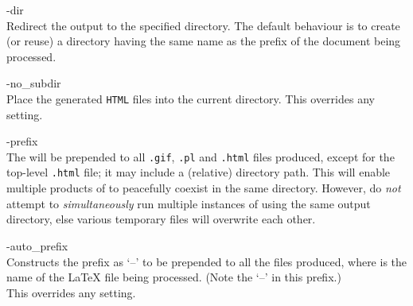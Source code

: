 \begin{htmllist}

\item [ -dir \Meta{output-directory}\label{cs_outputdir}]
\\
Redirect the output to the specified directory.\html{\\}
The default behaviour is to create (or reuse) a directory having the same
name as the prefix of the document being processed.%

%

\item [ -no\_subdir\label{cs_nosubdir}]
\\
Place the generated \texttt{HTML} files into the current directory.
This overrides any  setting.

%
%

\item [ -prefix \Meta{filename-prefix}\label{cs_prefix}]%
\\
The  will be prepended to all 
\texttt{.gif}, \texttt{.pl} and \texttt{.html} files produced, 
except for the top-level \texttt{.html} file;  
it may include a (relative) directory path. 
This will enable multiple products of \latextohtml{} to
peacefully coexist in the same directory.
However, do \emph{not} attempt to \emph{simultaneously} run multiple 
instances of \latextohtml{} using the same output directory, 
else various temporary files will overwrite each other.

%

\item [ -auto\_prefix\label{cs_autoprefix}]
\\
Constructs the prefix as `--'
to be prepended to all the files produced, 
where  is the name of the \LaTeX{} file being processed.
(Note the `--' in this prefix.)\\
This overrides any  setting.

%
%


\end{htmllist}
